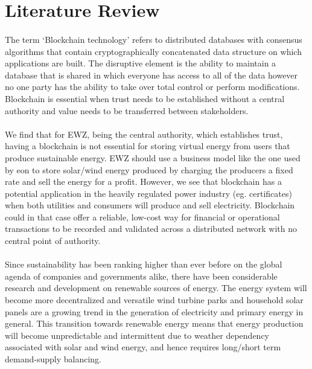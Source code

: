 \documentclass{scrartcl}
\begin{document}
	\section{Literature Review}
    
    \paragraph{}
    The term ‘Blockchain technology’ refers to distributed databases with consensus algorithms that contain cryptographically concatenated data structure on which applications are built. The disruptive element is the ability to maintain a database that is shared in which everyone has access to all of the data however no one party has the ability to take over total control or perform modifications. Blockchain is essential when trust needs to be established without a central authority and value needs to be transferred between stakeholders.
    
    \paragraph{}
    We find that for EWZ, being the central authority, which establishes trust, having a blockchain is not essential for storing virtual energy from users that produce sustainable energy. EWZ should use a business model like the one used by eon to store solar/wind energy produced by charging the producers a fixed rate and sell the energy for a profit. However, we see that blockchain has a potential application in the heavily regulated power industry (eg. certificates) when both utilities and consumers will produce and sell electricity. Blockchain could in that case offer a reliable, low-cost way for financial or operational transactions to be recorded and validated across a distributed network with no central point of authority. 
    
    \paragraph{}
    Since sustainability has been ranking higher than ever before on the global agenda of companies and governments alike, there have been considerable research and development on renewable sources of energy. The energy system will become more decentralized and versatile wind turbine parks and household solar panels are a growing trend in the generation of electricity and primary energy in general. This transition towards renewable energy means that energy production will become unpredictable and intermittent due to weather dependency associated with solar and wind energy, and hence requires long/short term demand-supply balancing.
    
\end{document}
